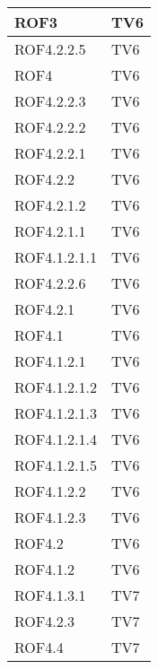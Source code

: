 \begin{center}
\begin{longtable}{|p{7cm}|p{7cm}|}
\midrule
ROF3
& TV6\\

\midrule
ROF4.2.2.5
& TV6\\

\midrule
ROF4
& TV6\\

\midrule
ROF4.2.2.3
& TV6\\

\midrule
ROF4.2.2.2
& TV6\\

\midrule
ROF4.2.2.1
& TV6\\

\midrule
ROF4.2.2
& TV6\\

\midrule
ROF4.2.1.2
& TV6\\

\midrule
ROF4.2.1.1
& TV6\\

\midrule
ROF4.1.2.1.1
& TV6\\

\midrule
ROF4.2.2.6
& TV6\\

\midrule
ROF4.2.1
& TV6\\

\midrule
ROF4.1
& TV6\\

\midrule
ROF4.1.2.1
& TV6\\

\midrule
ROF4.1.2.1.2
& TV6\\

\midrule
ROF4.1.2.1.3
& TV6\\

\midrule
ROF4.1.2.1.4
& TV6\\

\midrule
ROF4.1.2.1.5
& TV6\\

\midrule
ROF4.1.2.2
& TV6\\

\midrule
ROF4.1.2.3
& TV6\\

\midrule
ROF4.2
& TV6\\

\midrule
ROF4.1.2
& TV6\\

\midrule
ROF4.1.3.1
& TV7\\

\midrule
ROF4.2.3
& TV7\\

\midrule
ROF4.4
& TV7\\


\end{longtable}
\end{center}
